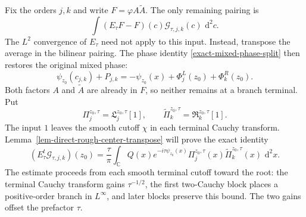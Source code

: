 \documentclass[a4paper,11pt]{article}
\newcommand{\C}{\mathbb{C}}
\newcommand{\dd}{\,\text{d}}
\theoremstyle{plain}
\theoremstyle{definition}
\theoremstyle{remark}
\begin{document}
Fix the orders $j,k$ and write $F=\varphi A\widetilde A$. The only remaining pairing is
\[
 \int (E_\tau F-F)(c)\mathcal G_{\tau,j,k}(c)\,\dd^2c.
\]
The $L^2$ convergence of $E_\tau$ need not apply to this input. Instead, transpose the average in the bilinear pairing. The phase identity \eqref{exact-mixed-phase-split} then restores the original mixed phase:
\[
 \psi_{z_0}(c_{j,k})+P_{j,k}
 =-\psi_{z_0}(x)+\Phi_j^L(z_0)+\Phi_k^R(z_0).
\]
Both factors $A$ and $\widetilde A$ are already in $F$, so neither remains at a branch terminal. Put
\begin{equation}\label{direct-transpose-branch-def}
 \Pi_j^{z_0,\tau}=\mathfrak L_j^{z_0,\tau}[1],
 \qquad \widetilde\Pi_k^{z_0,\tau}=\mathfrak R_k^{z_0,\tau}[1].
\end{equation}
The input $1$ leaves the smooth cutoff $\chi$ in each terminal Cauchy transform. Lemma~\ref{lem-direct-rough-center-transpose} will prove the exact identity
\begin{equation}\label{direct-rough-center-transpose-identity}
 (E_\tau^t\mathcal G_{\tau,j,k})(z_0)
 =\frac{\tau}{\pi}\int_{\C}
 Q(x)e^{-i\tau\psi_{z_0}(x)}
 \Pi_j^{z_0,\tau}(x)\widetilde\Pi_k^{z_0,\tau}(x)\,\dd^2x.
\end{equation}
The estimate proceeds from each smooth terminal cutoff toward the root: the terminal Cauchy transform gains $\tau^{-1/2}$, the first two-Cauchy block places a positive-order branch in $L^\infty$, and later blocks preserve this bound. The two gains offset the prefactor $\tau$.
\end{document}
